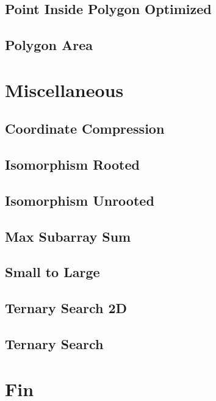 \subsection{Point Inside Polygon Optimized}
\raggedbottom
\hrulefill
\subsection{Polygon Area}
\raggedbottom
\hrulefill

\section{Miscellaneous}
\subsection{Coordinate Compression}
\raggedbottom
\hrulefill
\subsection{Isomorphism Rooted}
\raggedbottom
\hrulefill
\subsection{Isomorphism Unrooted}
\raggedbottom
\hrulefill
\subsection{Max Subarray Sum}
\raggedbottom
\hrulefill
\subsection{Small to Large}
\raggedbottom
\hrulefill
\subsection{Ternary Search 2D}
\raggedbottom
\hrulefill
\subsection{Ternary Search}
\raggedbottom
\hrulefill

\section{Fin}

